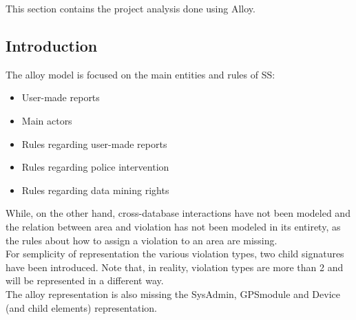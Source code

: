 

This section contains the project analysis done using Alloy.\\
\subsection{Introduction}
The alloy model is focused on the main entities and rules of SS:
\begin{itemize}
	\item User-made reports
	\item Main actors
	\item Rules regarding user-made reports
	\item Rules regarding police intervention
	\item Rules regarding data mining rights
\end{itemize}
While, on the other hand, cross-database interactions have not been modeled and the relation between area and violation has not been modeled in its entirety, as the rules about how to assign a violation to an area are missing.\\  
For semplicity of representation the various violation types, two child signatures have been introduced. Note that, in reality, violation types are more than 2 and will be represented in a different way.\\
The alloy representation is also missing the SysAdmin, GPSmodule and Device (and child elements) representation.\\
\\
\newpage
